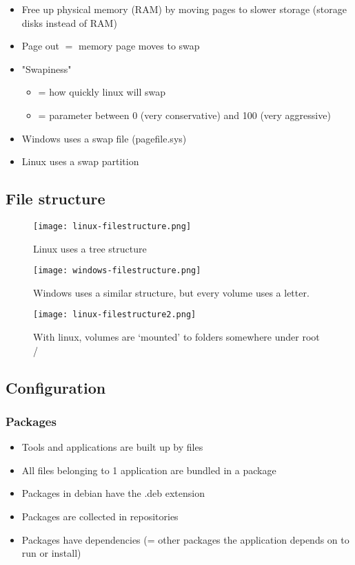 \documentclass{article}
\begin{document}
\begin{itemize}
    \item Free up physical memory (RAM) by moving pages to slower storage (storage disks instead of RAM)
    \item Page out $=$ memory page moves to swap
    \item "Swapiness"
    \begin{itemize}
        \item = how quickly linux will swap
        \item = parameter between 0 (very conservative) and 100 (very aggressive)
    \end{itemize}
    \item Windows uses a swap file (pagefile.sys)
    \item Linux uses a swap partition
\end{itemize}

\subsection{File structure}

\begin{figure}[H]
    \centering
    \texttt{[image: linux-filestructure.png]}
    \caption{Linux uses a tree structure}
\end{figure}

\begin{figure}[H]
    \centering
    \texttt{[image: windows-filestructure.png]}
    \caption{Windows uses a similar structure, but every volume uses a letter.}
\end{figure}

\begin{figure}[H]
    \centering
    \texttt{[image: linux-filestructure2.png]}
    \caption{With linux, volumes are `mounted' to folders somewhere under root /}
\end{figure}

\subsection{Configuration}

\subsubsection{Packages}

\begin{itemize}
    \item Tools and applications are built up by files
    \item All files belonging to 1 application are bundled in a package
    \item Packages in debian have the .deb extension
    \item Packages are collected in repositories
    \item Packages have dependencies (= other packages the application depends on to run or install)
\end{itemize}
\end{document}
